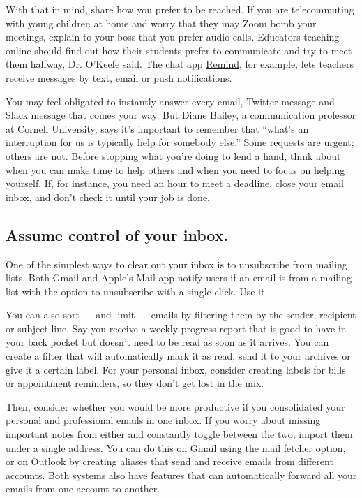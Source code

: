 With that in mind, share how you prefer to be reached. If you are
telecommuting with young children at home and worry that they may Zoom
bomb your meetings, explain to your boss that you prefer audio calls.
Educators teaching online should find out how their students prefer to
communicate and try to meet them halfway, Dr. O'Keefe said. The chat app
\href{https://www.remind.com/}{Remind}, for example, lets teachers
receive messages by text, email or push notifications.

You may feel obligated to instantly answer every email, Twitter message
and Slack message that comes your way. But Diane Bailey, a communication
professor at Cornell University, says it's important to remember that
``what's an interruption for us is typically help for somebody else.''
Some requests are urgent; others are not. Before stopping what you're
doing to lend a hand, think about when you can make time to help others
and when you need to focus on helping yourself. If, for instance, you
need an hour to meet a deadline, close your email inbox, and don't check
it until your job is done.

\hypertarget{assume-control-of-your-inbox}{%
\subsection{Assume control of your
inbox.}\label{assume-control-of-your-inbox}}

One of the simplest ways to clear out your inbox is to unsubscribe from
mailing lists. Both Gmail and Apple's Mail app notify users if an email
is from a mailing list with the option to unsubscribe with a single
click. Use it.

You can also sort --- and limit --- emails by filtering them by the
sender, recipient or subject line. Say you receive a weekly progress
report that is good to have in your back pocket but doesn't need to be
read as soon as it arrives. You can create a filter that will
automatically mark it as read, send it to your archives or give it a
certain label. For your personal inbox, consider creating labels for
bills or appointment reminders, so they don't get lost in the mix.

Then, consider whether you would be more productive if you consolidated
your personal and professional emails in one inbox. If you worry about
missing important notes from either and constantly toggle between the
two, import them under a single address. You can do this on Gmail using
the mail fetcher option, or on Outlook by creating aliases that send and
receive emails from different accounts. Both systems also have features
that can automatically forward all your emails from one account to
another.

